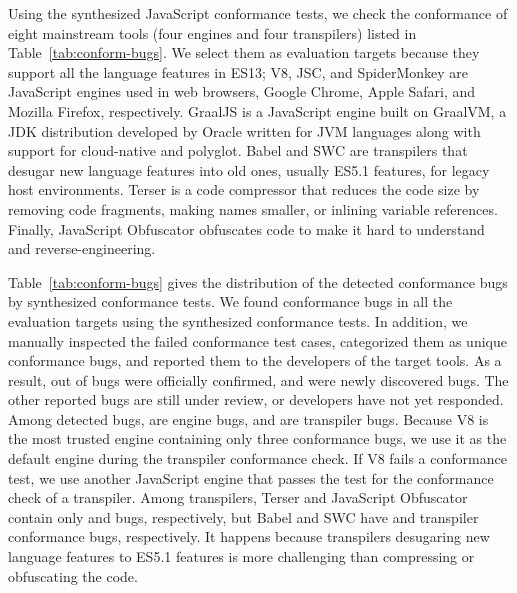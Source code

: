 
Using the synthesized JavaScript conformance tests, we check the conformance of
eight mainstream tools (four engines and four transpilers) listed in
Table~\ref{tab:conform-bugs}.
%
We select them as evaluation targets because they support all the language
features in ES13;
%
V8, JSC, and SpiderMonkey are JavaScript engines used in web browsers, Google
Chrome, Apple Safari, and Mozilla Firefox, respectively.
%
GraalJS is a JavaScript engine built on GraalVM, a JDK distribution developed by
Oracle written for JVM languages along with support for cloud-native and
polyglot.
%
Babel and SWC are transpilers that desugar new language features into old ones,
usually ES5.1 features, for legacy host environments.
%
Terser is a code compressor that reduces the code size by removing code
fragments, making names smaller, or inlining variable references.
%
Finally, JavaScript Obfuscator obfuscates code to make it hard to understand and
reverse-engineering.


Table~\ref{tab:conform-bugs} gives the distribution of the detected conformance
bugs by  synthesized conformance tests.
%
We found conformance bugs in all the evaluation targets using the synthesized
conformance tests.
%
In addition, we manually inspected the failed conformance test cases,
categorized them as  unique conformance bugs, and reported them to
the developers of the target tools.
%
As a result,  out of  bugs were officially confirmed, and
 were newly discovered bugs.
%
The other  reported bugs are still under review, or developers have
not yet responded.
%
Among  detected bugs,  are engine bugs, and  are
transpiler bugs.
%
Because V8 is the most trusted engine containing only three conformance bugs, we
use it as the default engine during the transpiler conformance check.
%
If V8 fails a conformance test, we use another JavaScript engine that passes the
test for the conformance check of a transpiler.
%
Among transpilers, Terser and JavaScript Obfuscator contain only  and
 bugs, respectively, but Babel and SWC have  and
 transpiler conformance bugs, respectively.
%
It happens because transpilers desugaring new language features to ES5.1
features is more challenging than compressing or obfuscating the code.


